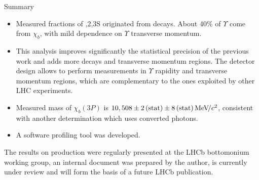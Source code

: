 \begin{frame}{Summary}

\begin{itemize}
\item Measured fractions of ,2,3S originated from \chib decays.
About 40\% of $\Upsilon$ come from $\chi_b$, with mild dependence on $\Upsilon$ transverse momentum.
\item This analysis improves significantly the statistical precision of the previous work and 
adds more decays and transverse momentum regions. The
\lhcb detector design allows to perform measurements in $\Upsilon$ rapidity and 
transverse momentum regions, which are complementary to the ones exploited 
by other LHC experiments.
\item Measured mass of $\chi_b(3P)$ is $10{,508}\pm2\mathrm{\,(stat)}\pm8\mathrm{\,(stat)}{\mathrm{\,Me\kern -0.1em V\!/}c^2}$, consistent with another determination which uses converted photons.
\item A software profiling tool was developed.
\end{itemize}

\begin{block}{}
The results on \chib production were regularly presented at the LHCb bottomonium working group,
an internal document was prepared by the author, is currently under review and will form 
the basis of a future LHCb publication.
\end{block}

\end{frame}